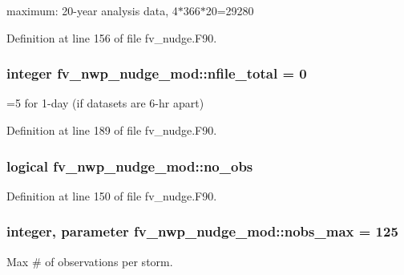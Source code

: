 maximum\-: 20-\/year analysis data, 4$\ast$366$\ast$20=29280 



Definition at line 156 of file fv\-\_\-nudge.\-F90.

\subsubsection[{nfile\-\_\-total}]{\setlength{\rightskip}{0pt plus 5cm}integer fv\-\_\-nwp\-\_\-nudge\-\_\-mod\-::nfile\-\_\-total = 0\hspace{0.3cm}{\ttfamily [private]}}\label{classfv__nwp__nudge__mod_a16ad156aeca41cd051feaf6544535476}


=5 for 1-\/day (if datasets are 6-\/hr apart) 



Definition at line 189 of file fv\-\_\-nudge.\-F90.

\subsubsection[{no\-\_\-obs}]{\setlength{\rightskip}{0pt plus 5cm}logical fv\-\_\-nwp\-\_\-nudge\-\_\-mod\-::no\-\_\-obs\hspace{0.3cm}{\ttfamily [private]}}\label{classfv__nwp__nudge__mod_a5a12cd412f969c30a2e68bb95a4dae80}


Definition at line 150 of file fv\-\_\-nudge.\-F90.

\subsubsection[{nobs\-\_\-max}]{\setlength{\rightskip}{0pt plus 5cm}integer, parameter fv\-\_\-nwp\-\_\-nudge\-\_\-mod\-::nobs\-\_\-max = 125\hspace{0.3cm}{\ttfamily [private]}}\label{classfv__nwp__nudge__mod_ac3d3a0cbdfff5f6ed3757fcc2b70309d}


Max \# of observations per storm. 



